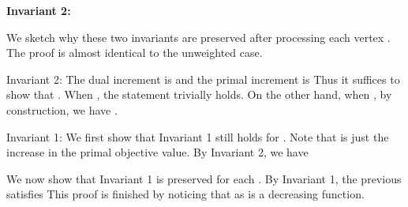 \documentclass{article}
\begin{document}
\textbf{Invariant 2:} 

We sketch why these two invariants are preserved after processing each vertex . The proof is almost identical to the unweighted case.

Invariant 2: The dual increment is  and the primal increment is 
Thus it suffices to show that . 
When , the statement trivially holds. On the other hand, when , by construction, we have
.

Invariant 1: We first show that Invariant 1 still holds for . Note that  is just the increase in the primal objective value. By Invariant 2, we have


We now show that Invariant 1 is preserved for each . By Invariant 1, the previous  satisfies 
This proof is finished by noticing that  as  is a decreasing function.








\clearpage{}
\end{document}
